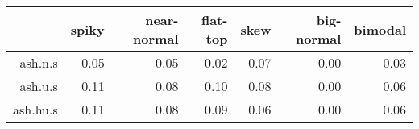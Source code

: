 \begin{tabular}{rrrrrrr}
  \toprule  & spiky & near-normal & flat-top & skew & big-normal & bimodal \\ 
  \midrule ash.n.s & 0.05 & 0.05 & 0.02 & 0.07 & 0.00 & 0.03 \\ 
  ash.u.s & 0.11 & 0.08 & 0.10 & 0.08 & 0.00 & 0.06 \\ 
  ash.hu.s & 0.11 & 0.08 & 0.09 & 0.06 & 0.00 & 0.06 \\ 
   \bottomrule \end{tabular}

